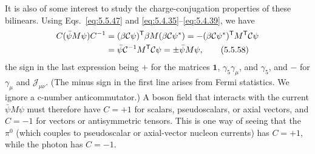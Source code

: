 It is also of some interest to study the charge-conjugation properties of these
bilinears. Using Eqs.~\eqref{eq:5.5.47} and \eqref{eq:5.4.35}--\eqref{eq:5.4.39}, we have
\begin{align}
C(\bar\psi M\psi)C^{-1}
&=(\beta\mathcal{C}\psi)^{\mathsf T}\beta M(\beta\mathcal{C}\psi^*)
=-(\beta\mathcal{C}\psi^*)^{\mathsf T}M^{\mathsf T}\mathcal{C}\psi
\notag\\
&=\bar\psi\mathcal{C}^{-1}M^{\mathsf T}\mathcal{C}\psi
=\mathbin{\pm}\bar\psi M\psi,
\tag{5.5.58}\label{eq:5.5.58}
\end{align}
the sign in the last expression being $+$ for the matrices $\mathbf{1}$,
$\gamma_5\gamma_\mu$, and $\gamma_5$, and $-$ for $\gamma_\mu$ and
$\mathcal{J}_{\mu\nu}$. (The minus sign in the first line arises from Fermi
statistics. We ignore a c-number anticommutator.) A boson field that interacts
with the current $\bar\psi M\psi$ must therefore have $C=+1$ for scalars,
pseudoscalars, or axial vectors, and $C=-1$ for vectors or antisymmetric
tensors. This is one way of seeing that the $\pi^0$ (which couples to
pseudoscalar or axial-vector nucleon currents) has $C=+1$, while the photon
has $C=-1$.
